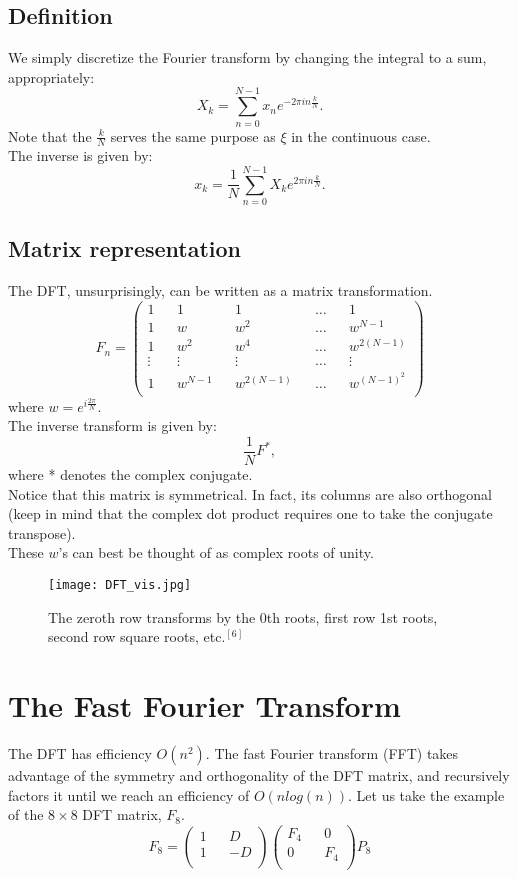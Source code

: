 \documentclass[11pt]{article}
\begin{document}
\subsection{Definition}
We simply discretize the Fourier transform by changing the integral to a sum, appropriately:
$$X_k=\sum_{n=0}^{N-1}x_n e^{-2\pi i n \frac{k}{N}}.$$
Note that the $\frac{k}{N}$ serves the same purpose as $\xi$ in the continuous case.\\
The inverse is given by:
$$ x_k = \frac{1}{N}\sum_{n=0}^{N-1}X_k e^{2\pi i n \frac{k}{N}}.$$
\subsection{Matrix representation}
The DFT, unsurprisingly, can be written as a matrix transformation.
$$
 F_n=\begin{pmatrix}
  1 && 1 && 1 && \dots && 1 \\
  1 && w && w^2 && \dots && w^{N-1}\\
  1 && w^2 && w^4 && \dots && w^{2(N-1)}\\
  \vdots && \vdots && \vdots && \dots &&\vdots \\
  1 && w^{N-1} && w^{2(N-1)} && \dots && w^{(N-1)^2} \\
 \end{pmatrix}$$
where $w=e^{i \frac{2\pi}{N}}$.\\
The inverse transform is given by:
$$ \frac{1}{N}F^*,$$ where * denotes the complex conjugate.\\
Notice that this matrix is symmetrical. In fact, its columns are also orthogonal (keep in mind that the complex dot product requires one to take the conjugate transpose).\\
These $w$'s can best be thought of as complex roots of unity.\\
\begin{figure}[h]
    \centering
    \texttt{[image: DFT\_vis.jpg]}
    \caption{The zeroth row transforms by the 0th roots, first row 1st roots, second row square roots, etc$.^{[6]}$}
\end{figure}

\section{The Fast Fourier Transform}
The DFT has efficiency $O(n^2)$. The fast Fourier transform (FFT) takes advantage of the symmetry and orthogonality of the DFT matrix, and recursively factors it until we reach an efficiency of $O(nlog(n)).$
Let us take the example of the $8\times8$ DFT matrix, $F_8$.
$$F_8=\begin{pmatrix}
  1 && D\\
  1 && -D\\
 \end{pmatrix}
 \begin{pmatrix}
  F_4 && 0\\
  0 && F_4\\
 \end{pmatrix}
 P_8
$$
\end{document}
